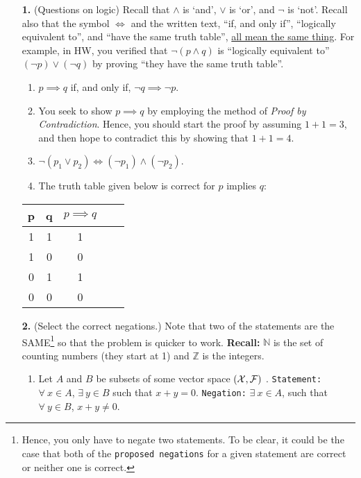 \documentclass[letterpaper]{article}
\begin{document}
\begin{enumerate}
\setlength{\itemsep}{5cm}


\item[{\bf 1.}] (Questions on logic) Recall that $\land$ is `and',  $\lor$ is `or', and $\neg$ is `not'.  Recall also that the symbol  $\Leftrightarrow$ and the written text, ``if, and only if'', ``logically equivalent to'', and ``have the same truth table'', \underline{all mean the same thing}.  For example, in HW, you verified that $\neg(p \land q)$ is ``logically equivalent to'' $ (\neg p) \lor (\neg q)$ by proving ``they have the same truth table''.
\begin{enumerate}
\setlength{\itemsep}{.15in}
\renewcommand{\labelenumi}{(\alph{enumi})}
\setlength{\itemsep}{.1in}
\item $p \implies q$ if, and only if, $ \neg q \implies  \neg p$.
\item You seek to show $p \implies q$ by employing the method of \textit{Proof by Contradiction}. Hence, you should start the proof by assuming $1+1=3$, and then hope to contradict this by showing that $1+1=4$.
\item $\neg (p_1 \lor p_2) \Leftrightarrow (\neg p_1) \land (\neg p_2)$.
\item The truth table given below is correct for $p$ implies $q$:
\end{enumerate}
\begin{center}
\begin{tabular}{|c|c|c|c|c|}
\hline
p & q & $p \implies q$ \\  \hline
1 & 1 & 1 \\
1 & 0 & 0  \\
0 & 1 & 1  \\
0 & 0 & 0  \\ \hline
\end{tabular}
\end{center}

\item[{\bf 2.}]  (Select the correct negations.) Note that two of the statements are the SAME\footnote{Hence, you only have to negate two statements. To be clear, it could be the case that both of the \texttt{proposed negations} for a given statement are correct or neither one is correct. } so that the problem is quicker to work. \textbf{Recall:} ${\mathbb N}$ is the set of counting numbers (they start at 1) and ${\mathbb Z}$  is the integers.
\begin{enumerate}
\setlength{\itemsep}{.15in}
\renewcommand{\labelenumi}{(\alph{enumi})}
\setlength{\itemsep}{.1in}
\item Let $A$ and $B$ be subsets of some vector space $({\cal X}, {\cal F})$ . \texttt{Statement:}   $\forall~x \in A$, $\exists~y \in B$   such that $x+y=0$.  \texttt{Negation:} $\exists ~ x \in A$,  such that $\forall ~y \in B$,  $x+y \neq0$.


\end{enumerate}
\end{enumerate}
\end{document}
